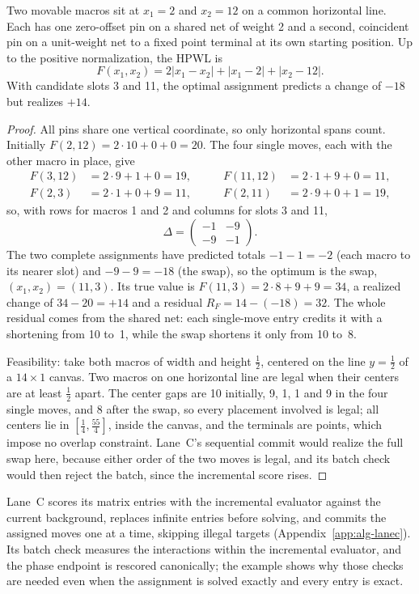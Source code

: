 \begin{appremark}\label{rem:assignment}
Two movable macros sit at $x_1=2$ and $x_2=12$ on a common horizontal line. Each has
one zero-offset pin on a shared net of weight 2 and a second, coincident pin on a
unit-weight net to a fixed point terminal at its own starting position. Up to the
positive normalization, the HPWL is
\begin{equation*}
 F(x_1,x_2)=2|x_1-x_2|+|x_1-2|+|x_2-12|.
\end{equation*}
With candidate slots 3 and 11, the optimal assignment predicts a change of $-18$ but
realizes $+14$.
\end{appremark}
\begin{proof}
All pins share one vertical coordinate, so only horizontal spans count. Initially
$F(2,12)=2\cdot10+0+0=20$. The four single moves, each with the other macro in place,
give
\begin{equation*}
\begin{aligned}
 F(3,12)&=2\cdot9+1+0=19, &\qquad F(11,12)&=2\cdot1+9+0=11,\\
 F(2,3)&=2\cdot1+0+9=11, &\qquad F(2,11)&=2\cdot9+0+1=19,
\end{aligned}
\end{equation*}
so, with rows for macros 1 and 2 and columns for slots 3 and 11,
\begin{equation*}
 \Delta=\begin{pmatrix}-1&-9\\-9&-1\end{pmatrix}.
\end{equation*}
The two complete assignments have predicted totals $-1-1=-2$ (each macro to its
nearer slot) and $-9-9=-18$ (the swap), so the optimum is the swap,
$(x_1,x_2)=(11,3)$. Its true value is $F(11,3)=2\cdot8+9+9=34$, a realized change of
$34-20=+14$ and a residual $R_F=14-(-18)=32$. The whole residual comes from the shared
net: each single-move entry credits it with a shortening from 10 to~1, while the swap
shortens it only from 10 to~8.

Feasibility: take both macros of width and height $\tfrac12$, centered on the line
$y=\tfrac12$ of a $14\times1$ canvas. Two macros on one horizontal line are legal when
their centers are at least $\tfrac12$ apart. The center gaps are 10 initially, 9, 1,
1 and 9 in the four single moves, and 8 after the swap, so every placement involved
is legal; all centers lie in $[\tfrac14,\tfrac{55}{4}]$, inside the canvas, and the
terminals are points, which impose no overlap constraint. Lane~C's sequential
commit would realize the full swap here, because either order of the two moves is
legal, and its batch check would then reject the batch, since the incremental score
rises.
\end{proof}
Lane~C scores its matrix entries with the incremental evaluator against the current
background, replaces infinite entries before solving, and commits the assigned moves
one at a time, skipping illegal targets (Appendix~\ref{app:alg-lanec}). Its batch
check measures the interactions within the incremental evaluator, and the phase
endpoint is rescored canonically; the example shows why those checks are needed even
when the assignment is solved exactly and every entry is exact.

